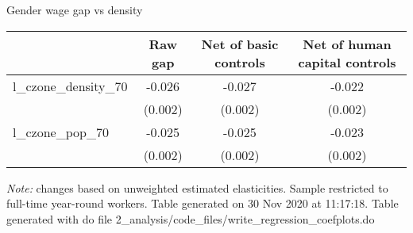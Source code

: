 \begin{center}
\begin{threeparttable}[!h]
\caption{Gender wage gap vs density}
\label{table:overall_change}
\begin{tabular}{lccc}
\toprule
\toprule
\textbf{}&\multicolumn{1}{c}{\textbf{Raw gap}}&\multicolumn{1}{c}{\textbf{Net of basic controls}}&\multicolumn{1}{c}{\textbf{Net of human capital controls}} \\
\midrule
l\_czone\_density\_70  &      -0.026\sym{***}&      -0.027\sym{***}&      -0.022\sym{***}\\
                    &     (0.002)         &     (0.002)         &     (0.002)         \\
l\_czone\_pop\_70      &      -0.025\sym{***}&      -0.025\sym{***}&      -0.023\sym{***}\\
                    &     (0.002)         &     (0.002)         &     (0.002)         \\
\bottomrule
\bottomrule
\end{tabular}
\begin{tablenotes}
\item \footnotesize \textit{Note:} changes based on unweighted estimated elasticities. Sample restricted to full-time year-round workers. Table generated on 30 Nov 2020 at 11:17:18. Table generated with do file 2\_analysis/code\_files/write\_regression\_coefplots.do
\end{tablenotes}
\end{threeparttable}
\end{center}
